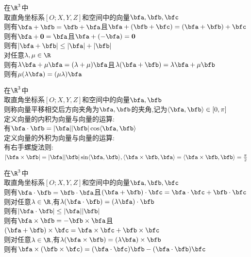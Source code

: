 \begin{dingli}
在$\R^3$中\\
取直角坐标系$[O;X,Y,Z]$和空间中的向量$\bfa,\bfb,\bfc$\\
则有$\bfa+\bfb=\bfb+\bfa$且$\bfa+(\bfb+\bfc)=(\bfa+\bfb)+\bfc$\\
则有$\bfa+\mathbf{0}=\bfa$且$\bfa+(-\bfa)=\mathbf{0}$\\
则有$|\bfa+\bfb|\leq |\bfa|+|\bfb|$\\
对任意$\lambda,\mu\in\R$\\
则有$\lambda\bfa+\mu\bfa=(\lambda+\mu)\bfa$且$\lambda(\bfa+\bfb)=\lambda\bfa+\mu\bfb$\\
则有$\mu(\lambda\bfa)=(\mu\lambda)\bfa$
\end{dingli}

\begin{dingyi}
在$\R^3$中\\
取直角坐标系$[O;X,Y,Z]$和空间中的向量$\bfa,\bfb$\\
则称向量平移相交后方向夹角为$\bfa,\bfb$的夹角,记为$\langle\bfa,\bfb\rangle\in[0,\pi]$\\
定义向量的内积为向量与向量的运算:\\
有$\bfa\cdot\bfb=|\bfa||\bfb|\cos\langle\bfa,\bfb\rangle$\\
定义向量的外积为向量与向量的运算:\\
有右手螺旋法则:$|\bfa\times\bfb|=|\bfa||\bfb|\sin\langle\bfa,\bfb\rangle,\langle\bfa\times\bfb,\bfa\rangle=\langle\bfa\times\bfb,\bfb\rangle=\frac{\pi}{2}$
\begin{center}
\end{center}
\end{dingyi}

\begin{dingli}
在$\R^3$中\\
取直角坐标系$[O;X,Y,Z]$和空间中的向量$\bfa,\bfb,\bfc$\\
则有$\bfa\cdot\bfb=\bfb\cdot\bfa$且$(\bfa+\bfb)\cdot\bfc=\bfa\cdot\bfc+\bfb\cdot\bfc$\\
则对任意$\lambda\in\R$,有$\lambda(\bfa\cdot\bfb)=(\lambda\bfa)\cdot\bfb$\\
则有$|\bfa\cdot\bfb|\leq|\bfa||\bfb|$\\
则有$\bfa\times\bfb=-\bfb\times\bfa$且$(\bfa+\bfb)\times\bfc=\bfa\times\bfc+\bfb\times\bfc$\\
则对任意$\lambda\in\R$,有$\lambda(\bfa\times\bfb)=(\lambda\bfa)\times\bfb$\\
则有$\bfa\times(\bfb\times\bfc)=(\bfa\cdot\bfc)\bfb-(\bfa\cdot\bfb)\bfc$
\end{dingli}

